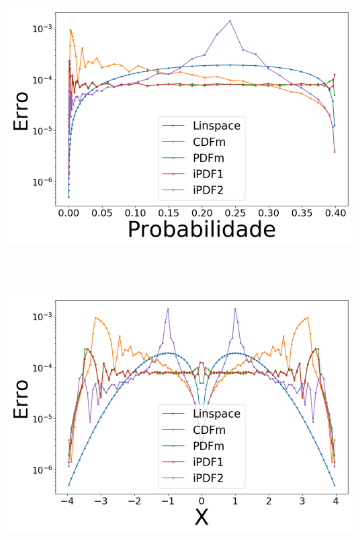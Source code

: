 \begin{figure}[H]
	\centering
	\begin{subfigure}[b]{0.45\textwidth}
		\centering 
		\includegraphics[width=\textwidth]{./figuras/error_normal_nearest_Probabilidade}
		\caption{}
		\label{fig:12a}
	\end{subfigure}
	\hfill
	~ %
	\begin{subfigure}[b]{0.45\textwidth}
		\centering 
		\includegraphics[width=\textwidth]{./figuras/error_normal_nearest_X}
		\caption{}
		\label{fig:12b}
	\end{subfigure}
	~ %

\end{figure}
